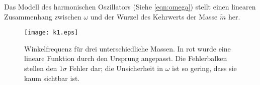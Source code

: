 Das Modell des harmonischen Oszillators (Siehe \autoref{eqn:omega}) stellt einen linearen Zusammenhang zwischen \( \omega \) und der Wurzel des Kehrwerts der Masse \( \tilde{m} \) her. 

\begin{figure}[H]
	\centering
	\texttt{[image: k1.eps]}
	\caption[Zusammenhang zwischen \( \omega \) und \( \tilde{m} \)]{Winkelfrequenz für drei unterschiedliche Massen. In rot wurde eine lineare Funktion durch den Ursprung angepasst. Die Fehlerbalken stellen den $1\sigma$ Fehler dar; die Unsicherheit in \( \omega \) ist so gering, dass sie kaum sichtbar ist.}
	\label{fig:k1}
\end{figure}